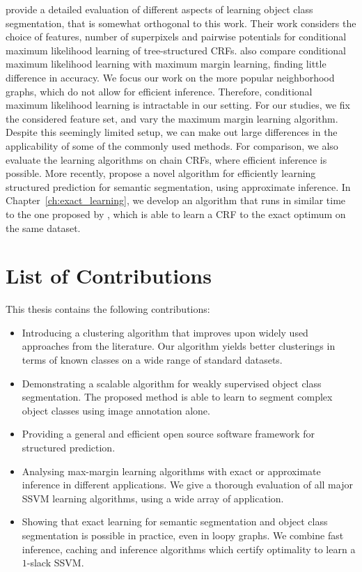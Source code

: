 \citet{nowozin2010parameter} provide a detailed evaluation of different aspects
of learning object class segmentation, that is somewhat orthogonal to this
work. Their work considers the choice of features, number of superpixels and
pairwise potentials for conditional maximum likelihood learning of
tree-structured CRFs.  \citet{nowozin2010parameter} also compare conditional
maximum likelihood learning with maximum margin learning, finding little
difference in accuracy.
We focus our work on the more popular neighborhood graphs, which do not allow
for efficient inference.  Therefore, conditional maximum likelihood learning is
intractable in our setting. For our studies, we fix the considered feature set,
and vary the maximum margin learning algorithm. Despite this seemingly limited
setup, we can make out large differences in the applicability of some of the
commonly used methods. For comparison, we also evaluate the learning algorithms
on chain CRFs, where efficient inference is possible.
More recently, \citet{lucchi2013learning} propose a novel algorithm for
efficiently learning structured prediction for semantic segmentation, using
approximate inference. In Chapter~\ref{ch:exact_learning}, we develop an
algorithm that runs in similar time to the one proposed by
\citet{lucchi2013learning}, which is able to learn a CRF to the exact optimum on
the same dataset.


\section{List of Contributions}
This thesis contains the following contributions:
\begin{itemize}
\item Introducing a clustering algorithm that improves upon widely used
    approaches from the literature. Our algorithm yields better clusterings in
    terms of known classes on a wide range of standard datasets.
\item Demonstrating a scalable algorithm for weakly supervised object class
    segmentation.  The proposed method is able to learn to segment complex object
    classes using image annotation alone.
\item Providing a general and efficient open source software framework for
    structured prediction. 
\item Analysing max-margin learning algorithms with exact or approximate
    inference in different applications. We give a thorough evaluation of
    all major SSVM learning algorithms, using a wide array of application.
\item Showing that exact learning for semantic segmentation and object class
    segmentation is possible in practice, even in loopy graphs. We combine
    fast inference, caching and inference algorithms which certify optimality
    to learn a $1$-slack SSVM.
\end{itemize}


